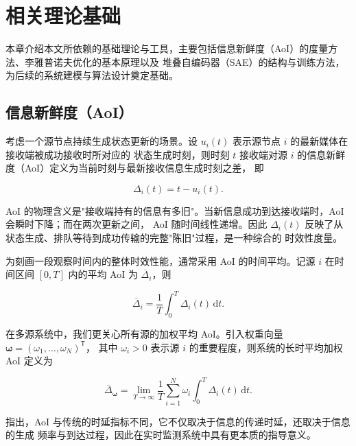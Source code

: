 
\chapter{相关理论基础}

本章介绍本文所依赖的基础理论与工具，主要包括信息新鲜度（AoI）的度量方法、李雅普诺夫优化的基本原理以及
堆叠自编码器（SAE）的结构与训练方法，为后续的系统建模与算法设计奠定基础。

\section{信息新鲜度（AoI）}

考虑一个源节点持续生成状态更新的场景。设 $u_i(t)$ 表示源节点 $i$ 的最新媒体在接收端被成功接收时所对应的
状态生成时刻，则时刻 $t$ 接收端对源 $i$ 的信息新鲜度（AoI）定义为当前时刻与最新接收信息生成时刻之差，
即

\begin{equation}\label{eq:aoi}
  \Delta_i(t) = t - u_i(t).
\end{equation}

AoI 的物理含义是"接收端持有的信息有多旧"。当新信息成功到达接收端时，AoI 会瞬时下降；而在两次更新之间，
AoI 随时间线性递增。因此 $\Delta_i(t)$ 反映了从状态生成、排队等待到成功传输的完整"陈旧"过程，是一种综合的
时效性度量。

为刻画一段观察时间内的整体时效性能，通常采用 AoI 的时间平均。记源 $i$ 在时间区间 $[0,T]$ 内的平均 AoI
为 $\overline{\Delta}_i$，则

\begin{equation}\label{eq:aoi-avg}
  \overline{\Delta}_i = \frac{1}{T}\int_{0}^{T}\Delta_i(t)\,\mathrm{d}t.
\end{equation}

在多源系统中，我们更关心所有源的加权平均 AoI。引入权重向量 $\boldsymbol{\omega} = (\omega_1,\ldots,\omega_N)^{\mathsf{T}}$，
其中 $\omega_i > 0$ 表示源 $i$ 的重要程度，则系统的长时平均加权 AoI 定义为

\begin{equation}\label{eq:aoi-weighted}
  \overline{\Delta}_{\boldsymbol{\omega}} =
  \lim_{T\to\infty}\frac{1}{T}\sum_{i=1}^{N}\omega_i\int_{0}^{T}\Delta_i(t)\,\mathrm{d}t.
\end{equation}

\cite{2015-Pappas-ICC} 指出，AoI 与传统的时延指标不同，它不仅取决于信息的传递时延，还取决于信息的生成
频率与到达过程，因此在实时监测系统中具有更本质的指导意义。

